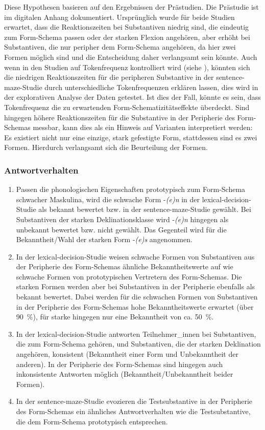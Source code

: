 Diese Hypothesen basieren auf den Ergebnissen der Prästudien. Die Prästudie ist im digitalen Anhang dokumentiert. Ursprünglich wurde für beide Studien erwartet, dass die Reaktionszeiten bei Substantiven niedrig sind, die eindeutig zum Form-Schema passen oder der starken Flexion angehören, aber erhöht bei Substantiven, die nur peripher dem Form-Schema angehören, da hier zwei Formen möglich sind und die Entscheidung daher verlangsamt sein könnte. Auch wenn in den Studien auf Tokenfrequenz kontrolliert wird (siehe ), könnten sich die niedrigen Reaktionszeiten für die peripheren Substantive in der sentence-maze-Studie durch unterschiedliche Tokenfrequenzen erklären lassen, dies wird in der explorativen Analyse der Daten getestet. Ist dies der Fall, könnte es sein, dass Tokenfrequenz die zu erwartenden Form-Schematizitätseffekte überdeckt. Sind hingegen höhere Reaktionszeiten für die Substantive in der Peripherie des Form-Schemas messbar, kann dies als ein Hinweis auf Varianten interpretiert werden: Es existiert nicht nur eine einzige, stark gefestigte Form, stattdessen sind es zwei Formen. Hierdurch verlangsamt sich die Beurteilung der Formen.

\subsubsection{Antwortverhalten}
\begin{enumerate}\sloppy
  \item Passen die phonologischen Eigenschaften prototypisch zum Form-Schema schwacher Maskulina, wird die schwache Form -\textit{(e)n} in der lex\-i\-cal-de\-ci\-sion-Stu\-die als bekannt bewertet bzw. in der sentence-maze-Studie gewählt. Bei Substantiven der starken Deklinationsklasse wird -\textit{(e)n} hingegen als unbekannt bewertet bzw. nicht gewählt. Das Gegenteil wird für die Bekanntheit/Wahl der starken Form -\textit{(e)s} angenommen.
  \item In der lexical-decision-Studie weisen schwache Formen von Substantiven aus der Peripherie des Form-Schemas ähnliche Bekanntheitswerte auf wie schwache Formen von prototypischen Vertretern des Form-Schemas. Die starken Formen werden aber bei Substantiven in der Peripherie ebenfalls als bekannt bewertet. Dabei werden für die schwachen Formen von Substantiven in der Peripherie des Form-Schemas hohe Bekanntheitswerte erwartet (über 90~\%), für starke hingegen nur eine Bekanntheit von ca. 50~\%.
  \item In der lexical-decision-Studie antworten Teilnehmer\_innen bei Substantiven, die zum Form-Schema gehören, und Substantiven, die der starken Deklination angehören, konsistent (Bekanntheit einer Form und Unbekanntheit der anderen). In der Peripherie des Form-Schemas sind hingegen auch inkonsistente Antworten möglich (Bekanntheit/Unbekanntheit beider Formen).
  \item In der sentence-maze-Studie evozieren die Testsubstantive in der Peripherie des Form-Schemas ein ähnliches Antwortverhalten wie die Testsubstantive, die dem Form-Schema prototypisch entsprechen.
\end{enumerate}

